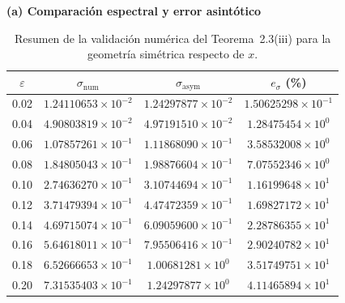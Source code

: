 \documentclass[11pt]{article}
\begin{document}
\begin{table}[!htbp]
\centering
\caption{Resumen de la validación numérica del Teorema~2.3(iii) para la geometría simétrica respecto de $x$.}
\label{tab:t23x_summary}
\small
\setlength{\tabcolsep}{5pt}
\textbf{(a) Comparación espectral y error asintótico}\\[0.4em]
\begin{tabular}{@{}cccc@{}}
\toprule
$\varepsilon$ & $\sigma_{\mathrm{num}}$ & $\sigma_{\mathrm{asym}}$ & $e_\sigma$ (\%) \\
\midrule
0.02 & $1.24110653\times10^{-2}$ & $1.24297877\times10^{-2}$ & $1.50625298\times10^{-1}$ \\
0.04 & $4.90803819\times10^{-2}$ & $4.97191510\times10^{-2}$ & $1.28475454\times10^{0}$ \\
0.06 & $1.07857261\times10^{-1}$ & $1.11868090\times10^{-1}$ & $3.58532008\times10^{0}$ \\
0.08 & $1.84805043\times10^{-1}$ & $1.98876604\times10^{-1}$ & $7.07552346\times10^{0}$ \\
0.10 & $2.74636270\times10^{-1}$ & $3.10744694\times10^{-1}$ & $1.16199648\times10^{1}$ \\
0.12 & $3.71479394\times10^{-1}$ & $4.47472359\times10^{-1}$ & $1.69827172\times10^{1}$ \\
0.14 & $4.69715074\times10^{-1}$ & $6.09059600\times10^{-1}$ & $2.28786355\times10^{1}$ \\
0.16 & $5.64618011\times10^{-1}$ & $7.95506416\times10^{-1}$ & $2.90240782\times10^{1}$ \\
0.18 & $6.52666653\times10^{-1}$ & $1.00681281\times10^{0}$ & $3.51749751\times10^{1}$ \\
0.20 & $7.31535403\times10^{-1}$ & $1.24297877\times10^{0}$ & $4.11465894\times10^{1}$ \\
\bottomrule
\end{tabular}


\end{table}
\end{document}
